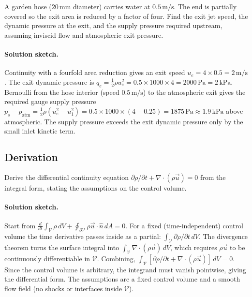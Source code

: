 \begin{exercise}
A garden hose ($20\,\si{\milli\meter}$ diameter) carries water at
$0.5\,\si{\meter\per\second}$. The end is partially covered so the
exit area is reduced by a factor of four. Find the exit jet speed,
the dynamic pressure at the exit, and the supply pressure required
upstream, assuming inviscid flow and atmospheric exit pressure.

\paragraph{Solution sketch.} Continuity with a fourfold area
reduction gives an exit speed $u_e = 4\times 0.5 =
2\,\si{\meter\per\second}$. The exit dynamic pressure is $q_e =
\tfrac12\rho u_e^2 = 0.5\times 1000\times 4 = 2000\,\text{Pa} =
2\,\text{kPa}$. Bernoulli from the hose interior (speed
$0.5\,\si{\meter\per\second}$) to the atmospheric exit gives the
required gauge supply pressure $p_s - p_\text{atm} = \tfrac12\rho
(u_e^2 - u_1^2) = 0.5\times 1000\times(4 - 0.25) =
1875\,\text{Pa}\approx 1.9\,\text{kPa}$ above atmospheric. The supply
pressure exceeds the exit dynamic pressure only by the small inlet
kinetic term.
\end{exercise}

\subsection*{Derivation}

\begin{exercise}
Derive the differential continuity equation $\partial \rho/
\partial t + \nabla\cdot(\rho\vec{u}) = 0$ from the integral form,
stating the assumptions on the control volume.

\paragraph{Solution sketch.} Start from $\frac{d}{dt}\int_\mathcal{V}
\rho\,dV + \oint_{\partial\mathcal{V}}\rho\vec{u}\cdot\hat{n}\,dA =
0$. For a fixed (time-independent) control volume the time derivative
passes inside as a partial: $\int_\mathcal{V}\partial\rho/\partial
t\,dV$. The divergence theorem turns the surface integral into
$\int_\mathcal{V}\nabla\cdot(\rho\vec{u})\,dV$, which requires
$\rho\vec{u}$ to be continuously differentiable in $\mathcal{V}$.
Combining, $\int_\mathcal{V}[\partial\rho/\partial t +
\nabla\cdot(\rho\vec{u})]\,dV = 0$. Since the control volume is
arbitrary, the integrand must vanish pointwise, giving the
differential form. The assumptions are a fixed control volume and a
smooth flow field (no shocks or interfaces inside $\mathcal{V}$).
\end{exercise}


